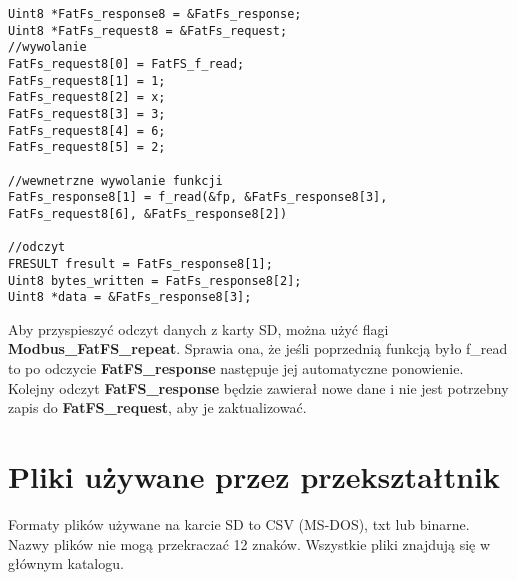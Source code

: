 \documentclass[12pt,a4paper]{article}
\begin{document}
\begin{lstlisting}[float=!h, style=customc, caption={Pseudokod wykorzystania FatFS przez Modbus}, label={lst:pseudo}, belowskip=-10pt]
Uint8 *FatFs_response8 = &FatFs_response;
Uint8 *FatFs_request8 = &FatFs_request;
//wywolanie
FatFs_request8[0] = FatFS_f_read;
FatFs_request8[1] = 1;
FatFs_request8[2] = x;
FatFs_request8[3] = 3;
FatFs_request8[4] = 6;
FatFs_request8[5] = 2;

//wewnetrzne wywolanie funkcji
FatFs_response8[1] = f_read(&fp, &FatFs_response8[3], FatFs_request8[6], &FatFs_response8[2])

//odczyt
FRESULT fresult = FatFs_response8[1];
Uint8 bytes_written = FatFs_response8[2];
Uint8 *data = &FatFs_response8[3];
\end{lstlisting}

Aby przyspieszyć odczyt danych z karty SD, można użyć flagi \textbf{Modbus\_FatFS\_repeat}. Sprawia ona, że jeśli poprzednią funkcją było f\_read to po odczycie \textbf{FatFS\_response} następuje jej automatyczne ponowienie. Kolejny odczyt \textbf{FatFS\_response} będzie zawierał nowe dane i nie jest potrzebny zapis do \textbf{FatFS\_request}, aby je zaktualizować.



\section{Pliki używane przez przekształtnik}
Formaty plików używane na karcie SD to CSV (MS-DOS), txt lub binarne. Nazwy plików nie mogą przekraczać 12 znaków. Wszystkie pliki znajdują się w głównym katalogu.
\end{document}
